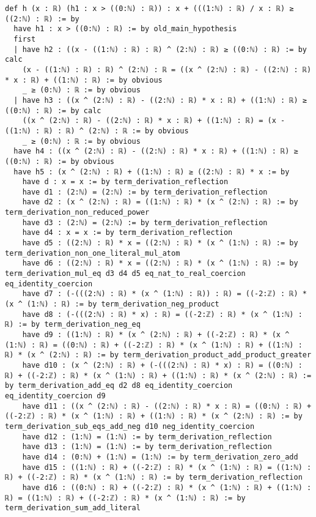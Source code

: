 \documentclass{article}
\begin{document}
\begin{tcolorbox}[colback=white!10, width=\linewidth]
\begin{lstlisting}[language=Lean4]
def h (x : ℝ) (h1 : x > ((0:ℕ) : ℝ)) : x + (((1:ℕ) : ℝ) / x : ℝ) ≥ ((2:ℕ) : ℝ) := by
  have h1 : x > ((0:ℕ) : ℝ) := by old_main_hypothesis
  first
  | have h2 : ((x - ((1:ℕ) : ℝ) : ℝ) ^ (2:ℕ) : ℝ) ≥ ((0:ℕ) : ℝ) := by calc
    (x - ((1:ℕ) : ℝ) : ℝ) ^ (2:ℕ) : ℝ = ((x ^ (2:ℕ) : ℝ) - ((2:ℕ) : ℝ) * x : ℝ) + ((1:ℕ) : ℝ) := by obvious
    _ ≥ (0:ℕ) : ℝ := by obvious
  | have h3 : ((x ^ (2:ℕ) : ℝ) - ((2:ℕ) : ℝ) * x : ℝ) + ((1:ℕ) : ℝ) ≥ ((0:ℕ) : ℝ) := by calc
    ((x ^ (2:ℕ) : ℝ) - ((2:ℕ) : ℝ) * x : ℝ) + ((1:ℕ) : ℝ) = (x - ((1:ℕ) : ℝ) : ℝ) ^ (2:ℕ) : ℝ := by obvious
    _ ≥ (0:ℕ) : ℝ := by obvious
  have h4 : ((x ^ (2:ℕ) : ℝ) - ((2:ℕ) : ℝ) * x : ℝ) + ((1:ℕ) : ℝ) ≥ ((0:ℕ) : ℝ) := by obvious
  have h5 : (x ^ (2:ℕ) : ℝ) + ((1:ℕ) : ℝ) ≥ ((2:ℕ) : ℝ) * x := by
    have d : x = x := by term_derivation_reflection
    have d1 : (2:ℕ) = (2:ℕ) := by term_derivation_reflection
    have d2 : (x ^ (2:ℕ) : ℝ) = ((1:ℕ) : ℝ) * (x ^ (2:ℕ) : ℝ) := by term_derivation_non_reduced_power
    have d3 : (2:ℕ) = (2:ℕ) := by term_derivation_reflection
    have d4 : x = x := by term_derivation_reflection
    have d5 : ((2:ℕ) : ℝ) * x = ((2:ℕ) : ℝ) * (x ^ (1:ℕ) : ℝ) := by term_derivation_non_one_literal_mul_atom
    have d6 : ((2:ℕ) : ℝ) * x = ((2:ℕ) : ℝ) * (x ^ (1:ℕ) : ℝ) := by term_derivation_mul_eq d3 d4 d5 eq_nat_to_real_coercion eq_identity_coercion
    have d7 : (-(((2:ℕ) : ℝ) * (x ^ (1:ℕ) : ℝ)) : ℝ) = ((-2:ℤ) : ℝ) * (x ^ (1:ℕ) : ℝ) := by term_derivation_neg_product
    have d8 : (-(((2:ℕ) : ℝ) * x) : ℝ) = ((-2:ℤ) : ℝ) * (x ^ (1:ℕ) : ℝ) := by term_derivation_neg_eq
    have d9 : ((1:ℕ) : ℝ) * (x ^ (2:ℕ) : ℝ) + ((-2:ℤ) : ℝ) * (x ^ (1:ℕ) : ℝ) = ((0:ℕ) : ℝ) + ((-2:ℤ) : ℝ) * (x ^ (1:ℕ) : ℝ) + ((1:ℕ) : ℝ) * (x ^ (2:ℕ) : ℝ) := by term_derivation_product_add_product_greater
    have d10 : (x ^ (2:ℕ) : ℝ) + (-(((2:ℕ) : ℝ) * x) : ℝ) = ((0:ℕ) : ℝ) + ((-2:ℤ) : ℝ) * (x ^ (1:ℕ) : ℝ) + ((1:ℕ) : ℝ) * (x ^ (2:ℕ) : ℝ) := by term_derivation_add_eq d2 d8 eq_identity_coercion eq_identity_coercion d9
    have d11 : ((x ^ (2:ℕ) : ℝ) - ((2:ℕ) : ℝ) * x : ℝ) = ((0:ℕ) : ℝ) + ((-2:ℤ) : ℝ) * (x ^ (1:ℕ) : ℝ) + ((1:ℕ) : ℝ) * (x ^ (2:ℕ) : ℝ) := by term_derivation_sub_eqs_add_neg d10 neg_identity_coercion
    have d12 : (1:ℕ) = (1:ℕ) := by term_derivation_reflection
    have d13 : (1:ℕ) = (1:ℕ) := by term_derivation_reflection
    have d14 : (0:ℕ) + (1:ℕ) = (1:ℕ) := by term_derivation_zero_add
    have d15 : ((1:ℕ) : ℝ) + ((-2:ℤ) : ℝ) * (x ^ (1:ℕ) : ℝ) = ((1:ℕ) : ℝ) + ((-2:ℤ) : ℝ) * (x ^ (1:ℕ) : ℝ) := by term_derivation_reflection
    have d16 : ((0:ℕ) : ℝ) + ((-2:ℤ) : ℝ) * (x ^ (1:ℕ) : ℝ) + ((1:ℕ) : ℝ) = ((1:ℕ) : ℝ) + ((-2:ℤ) : ℝ) * (x ^ (1:ℕ) : ℝ) := by term_derivation_sum_add_literal

\end{lstlisting}
\end{tcolorbox}
\end{document}

